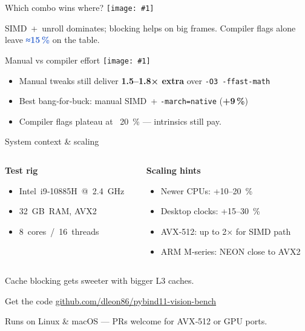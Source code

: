\documentclass[aspectratio=169,professionalfonts]{beamer}  %
\newcommand{\halfimg}[1]{\texttt{[image: \#1]}}
\begin{document}
\begin{frame}[t]{Which combo wins where?}
  \centering
  \halfimg{figures/grouped_by_config_speedups.png}

  \vspace{0.4em}
  \scriptsize SIMD + unroll dominates; blocking helps on big frames. Compiler flags alone leave
  \textcolor{highlight}{\textbf{≈15\,\%}} on the table.
\end{frame}

\begin{frame}[t]{Manual vs compiler effort}
  \centering
  \halfimg{figures/efficiency_ratio_analysis.png}

  \vspace{0.4em}
  \begin{itemize}
    \item Manual tweaks still deliver \textcolor{speedup}{\textbf{1.5–1.8× extra}} over \texttt{-O3 -ffast-math}
    \item Best bang‑for‑buck: manual SIMD + \texttt{-march=native} (\textcolor{speedup}{\textbf{+9\,\%}})
    \item Compiler flags plateau at ~20 \% — intrinsics still pay.
  \end{itemize}
\end{frame}

\begin{frame}[t]{System context & scaling}
  \begin{columns}[T]
    \begin{column}{0.48\linewidth}
      \textbf{Test rig}
      \begin{itemize}
        \item Intel i9‑10885H @ 2.4 GHz
        \item 32 GB RAM, AVX2
        \item 8 cores / 16 threads
      \end{itemize}
    \end{column}
    \begin{column}{0.48\linewidth}
      \textbf{Scaling hints}
      \begin{itemize}
        \item Newer CPUs: +10–20 \%
        \item Desktop clocks: +15–30 \%
        \item AVX‑512: up to 2× for SIMD path
        \item ARM M‑series: NEON close to AVX2
      \end{itemize}
    \end{column}
  \end{columns}
  \vspace{0.3em}
  \scriptsize Cache blocking gets sweeter with bigger L3 caches.
\end{frame}

\begin{frame}[c]{Get the code}
  \centering
  {\LARGE\href{https://github.com/dleon86/pybind11-vision-bench}{github.com/dleon86/pybind11-vision-bench}}

  \vspace{1.5em}
  Runs on Linux & macOS — PRs welcome for AVX‑512 or GPU ports.
\end{frame}
\end{document}
